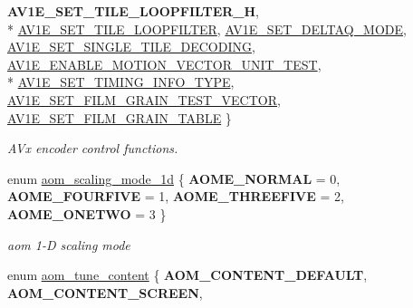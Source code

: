 \begin{DoxyCompactItemize}
{\bfseries A\+V1\+E\+\_\+\+S\+E\+T\+\_\+\+T\+I\+L\+E\+\_\+\+L\+O\+O\+P\+F\+I\+L\+T\+E\+R\+\_\+H}, 
\\*
\hyperlink{group__aom__encoder_ggae78dde67a6d78f332e9bdba0dde42db5ad73c1279b456a8296686695c1949eb97}{A\+V1\+E\+\_\+\+S\+E\+T\+\_\+\+T\+I\+L\+E\+\_\+\+L\+O\+O\+P\+F\+I\+L\+T\+ER}, 
\hyperlink{group__aom__encoder_ggae78dde67a6d78f332e9bdba0dde42db5ad26eda6211bf3d5fe4f5999ec52b264b}{A\+V1\+E\+\_\+\+S\+E\+T\+\_\+\+D\+E\+L\+T\+A\+Q\+\_\+\+M\+O\+DE}, 
\hyperlink{group__aom__encoder_ggae78dde67a6d78f332e9bdba0dde42db5af341538631ffe2ac2b562c8b5336a10a}{A\+V1\+E\+\_\+\+S\+E\+T\+\_\+\+S\+I\+N\+G\+L\+E\+\_\+\+T\+I\+L\+E\+\_\+\+D\+E\+C\+O\+D\+I\+NG}, 
\hyperlink{group__aom__encoder_ggae78dde67a6d78f332e9bdba0dde42db5a0c45a2184ff7068f470cb9f128c3605d}{A\+V1\+E\+\_\+\+E\+N\+A\+B\+L\+E\+\_\+\+M\+O\+T\+I\+O\+N\+\_\+\+V\+E\+C\+T\+O\+R\+\_\+\+U\+N\+I\+T\+\_\+\+T\+E\+ST}, 
\\*
\hyperlink{group__aom__encoder_ggae78dde67a6d78f332e9bdba0dde42db5a857e822046c62a4c774b1d16c4e453dd}{A\+V1\+E\+\_\+\+S\+E\+T\+\_\+\+T\+I\+M\+I\+N\+G\+\_\+\+I\+N\+F\+O\+\_\+\+T\+Y\+PE}, 
\hyperlink{group__aom__encoder_ggae78dde67a6d78f332e9bdba0dde42db5a437e6b282a2395b4b08a9acde3e41cfb}{A\+V1\+E\+\_\+\+S\+E\+T\+\_\+\+F\+I\+L\+M\+\_\+\+G\+R\+A\+I\+N\+\_\+\+T\+E\+S\+T\+\_\+\+V\+E\+C\+T\+OR}, 
\hyperlink{group__aom__encoder_ggae78dde67a6d78f332e9bdba0dde42db5ad5846c6f49d37e65a03c39e68d487097}{A\+V1\+E\+\_\+\+S\+E\+T\+\_\+\+F\+I\+L\+M\+\_\+\+G\+R\+A\+I\+N\+\_\+\+T\+A\+B\+LE}
 \}\begin{DoxyCompactList}\small\item\em A\+Vx encoder control functions. \end{DoxyCompactList}
\item 
enum \hyperlink{group__aom__encoder_ga2a1791d26fca39303154f0f9ece3e295}{aom\+\_\+scaling\+\_\+mode\+\_\+1d} \{ {\bfseries A\+O\+M\+E\+\_\+\+N\+O\+R\+M\+AL} = 0, 
{\bfseries A\+O\+M\+E\+\_\+\+F\+O\+U\+R\+F\+I\+VE} = 1, 
{\bfseries A\+O\+M\+E\+\_\+\+T\+H\+R\+E\+E\+F\+I\+VE} = 2, 
{\bfseries A\+O\+M\+E\+\_\+\+O\+N\+E\+T\+WO} = 3
 \}\begin{DoxyCompactList}\small\item\em aom 1-\/D scaling mode \end{DoxyCompactList}
\item 
enum \hyperlink{group__aom__encoder_ga801f5eb2cb93da19a2f347ae7a44166a}{aom\+\_\+tune\+\_\+content} \{ {\bfseries A\+O\+M\+\_\+\+C\+O\+N\+T\+E\+N\+T\+\_\+\+D\+E\+F\+A\+U\+LT}, 
{\bfseries A\+O\+M\+\_\+\+C\+O\+N\+T\+E\+N\+T\+\_\+\+S\+C\+R\+E\+EN}, 

\end{DoxyCompactItemize}
